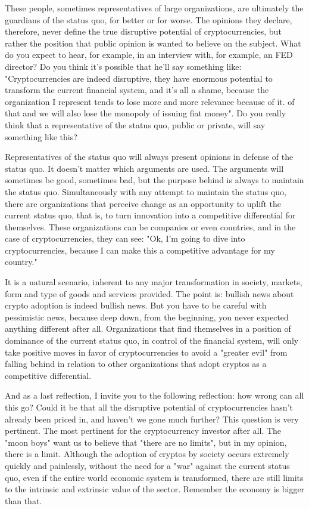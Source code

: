 These people, sometimes representatives of large organizations, are ultimately the guardians of the status quo, for better or for worse. The opinions they declare, therefore, never define the true disruptive potential of cryptocurrencies, but rather the position that public opinion is wanted to believe on the subject. What do you expect to hear, for example, in an interview with, for example, an FED director? Do you think it's possible that he'll say something like: "Cryptocurrencies are indeed disruptive, they have enormous potential to transform the current financial system, and it's all a shame, because the organization I represent tends to lose more and more relevance because of it. of that and we will also lose the monopoly of issuing fiat money". Do you really think that a representative of the status quo, public or private, will say something like this?

Representatives of the status quo will always present opinions in defense of the status quo. It doesn't matter which arguments are used. The arguments will sometimes be good, sometimes bad, but the purpose behind is always to maintain the status quo. Simultaneously with any attempt to maintain the status quo, there are organizations that perceive change as an opportunity to uplift the current status quo, that is, to turn innovation into a competitive differential for themselves. These organizations can be companies or even countries, and in the case of cryptocurrencies, they can see: "Ok, I'm going to dive into cryptocurrencies, because I can make this a competitive advantage for my country."

It is a natural scenario, inherent to any major transformation in society, markets, form and type of goods and services provided. The point is: bullish news about crypto adoption is indeed bullish news. But you have to be careful with pessimistic news, because deep down, from the beginning, you never expected anything different after all. Organizations that find themselves in a position of dominance of the current status quo, in control of the financial system, will only take positive moves in favor of cryptocurrencies to avoid a "greater evil" from falling behind in relation to other organizations that adopt cryptos as a competitive differential.

And as a last reflection, I invite you to the following reflection: how wrong can all this go? Could it be that all the disruptive potential of cryptocurrencies hasn't already been priced in, and haven't we gone much further? This question is very pertinent. The most pertinent for the cryptocurrency investor after all. The "moon boys" want us to believe that "there are no limits", but in my opinion, there is a limit. Although the adoption of cryptos by society occurs extremely quickly and painlessly, without the need for a "war" against the current status quo, even if the entire world economic system is transformed, there are still limits to the intrinsic and extrinsic value of the sector. Remember the economy is bigger than that.

